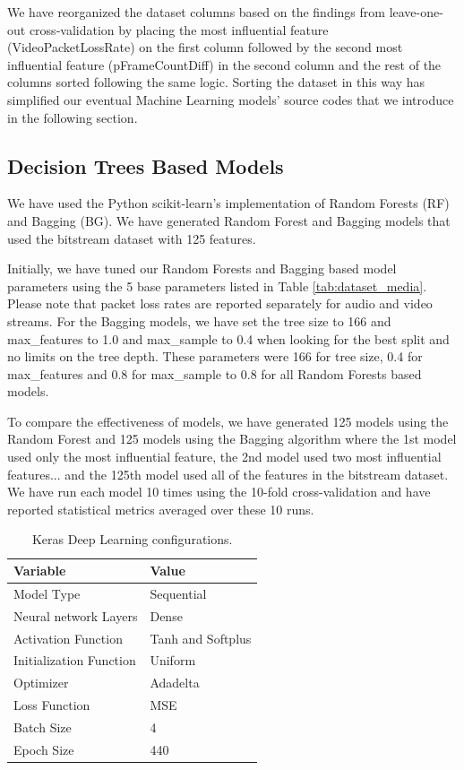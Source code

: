 \documentclass[journal]{IEEEtran}
\begin{document}
We have reorganized the dataset columns based on the findings from leave-one-out cross-validation by placing the most influential feature (VideoPacketLossRate) on the first column followed by the second most influential feature (pFrameCountDiff) in the second column and the rest of the columns sorted following the same logic. Sorting the dataset in this way has simplified our eventual Machine Learning models' source codes that we introduce in the following section. 

\subsection{Decision Trees Based Models} 

We have used the Python scikit-learn's implementation of Random Forests (RF) and Bagging (BG). We have generated Random Forest and Bagging models that used the bitstream dataset with 125 features. 

Initially, we have tuned our Random Forests and Bagging based model parameters using the 5 base parameters listed in Table \ref{tab:dataset_media}. Please note that packet loss rates are reported separately for audio and video streams. For the Bagging models, we have set the tree size to 166 and max\_features to 1.0 and max\_sample to 0.4 when looking for the best split and no limits on the tree depth. These parameters were 166 for tree size, 0.4 for max\_features and 0.8 for max\_sample to 0.8 for all Random Forests based models. 

To compare the effectiveness of models, we have generated 125 models using the Random Forest and 125 models using the Bagging algorithm where the 1st model used only the most influential feature, the 2nd model used two most influential features... and the 125th model used all of the features in the bitstream dataset. We have run each model 10 times using the 10-fold cross-validation and have reported statistical metrics averaged over these 10 runs. 

\begin{table}
\centering
\caption{Keras Deep Learning configurations.}
\label{tab:bitstreamKeras}
\begin{tabular}{|l||l|} \hline
Variable & Value \\ \hline
Model Type & Sequential  \\ \hline
Neural network Layers & Dense  \\ \hline
Activation Function & Tanh and Softplus  \\ \hline
Initialization Function & Uniform  \\ \hline
Optimizer & Adadelta  \\ \hline
Loss Function & MSE  \\ \hline
Batch Size & 4  \\ \hline
Epoch Size & 440  \\ \hline
\end{tabular}
\end{table}
\end{document}
